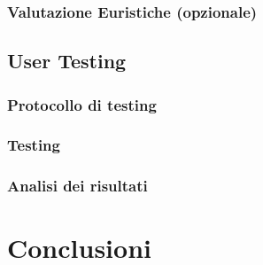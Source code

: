 \documentclass[../Report.tex]{subfiles}
\begin{document}
    \subsection{Valutazione Euristiche (opzionale)}
    \section{User Testing}
    \subsection{Protocollo di testing}
    \subsection{Testing}
    \subsection{Analisi dei risultati}

    \chapter{Conclusioni}
\end{document}
